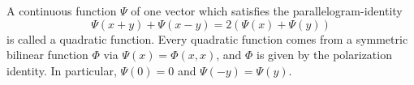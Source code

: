 A continuous function $\Psi$ of one vector which satisfies the parallelogram-identity
$$\Psi(x + y) + \Psi(x - y) = 2(\Psi(x) + \Psi(y))$$
is called a quadratic function. Every quadratic function comes from a symmetric bilinear function $\Phi$ via $\Psi(x) = \Phi(x, x)$, and $\Phi$ is given by the polarization identity. In particular, $\Psi(0) = 0$ and $\Psi(-y) = \Psi(y)$.

